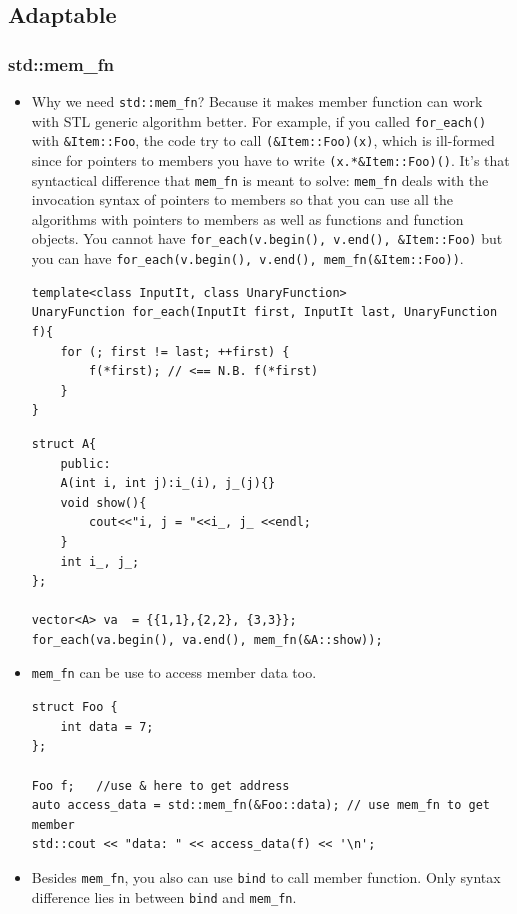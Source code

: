 \documentclass[a4paper,11pt,twoside]{book}
\begin{document}
\subsection{Adaptable}

\subsubsection{std::mem\_fn }
\begin{itemize}
	\item Why we need \texttt{std::mem\_fn}? Because it makes member function can work with STL generic algorithm better. For example, if you called \texttt{for\_each()} with \texttt{\&Item::Foo}, the code try to call \texttt{(\&Item::Foo)(x)}, which is ill-formed since for pointers to members you have to write \texttt{(x.*\&Item::Foo)()}. It's that syntactical difference that \texttt{mem\_fn} is meant to solve: \texttt{mem\_fn} deals with the invocation syntax of pointers to members so that you can use all the algorithms with pointers to members as well as functions and function objects. You cannot have \texttt{for\_each(v.begin(), v.end(), \&Item::Foo)} but you can have \texttt{for\_each(v.begin(), v.end(), mem\_fn(\&Item::Foo))}.
\begin{lstlisting}
template<class InputIt, class UnaryFunction>
UnaryFunction for_each(InputIt first, InputIt last, UnaryFunction f){
	for (; first != last; ++first) {
		f(*first); // <== N.B. f(*first)
	}
}
\end{lstlisting}

\begin{lstlisting}
struct A{
	public:
	A(int i, int j):i_(i), j_(j){}
	void show(){
		cout<<"i, j = "<<i_, j_ <<endl;
	}
	int i_, j_;
};

vector<A> va  = {{1,1},{2,2}, {3,3}};
for_each(va.begin(), va.end(), mem_fn(&A::show));
\end{lstlisting}

	\item \texttt{mem\_fn} can be use to access member data too.
\begin{lstlisting}
struct Foo {
	int data = 7;
};

Foo f;   //use & here to get address
auto access_data = std::mem_fn(&Foo::data); // use mem_fn to get member
std::cout << "data: " << access_data(f) << '\n';
\end{lstlisting}


	\item Besides \texttt{mem\_fn}, you also can use \texttt{bind} to call member function. Only syntax difference lies in between \texttt{bind} and \texttt{mem\_fn}.


\end{itemize}
\end{document}
